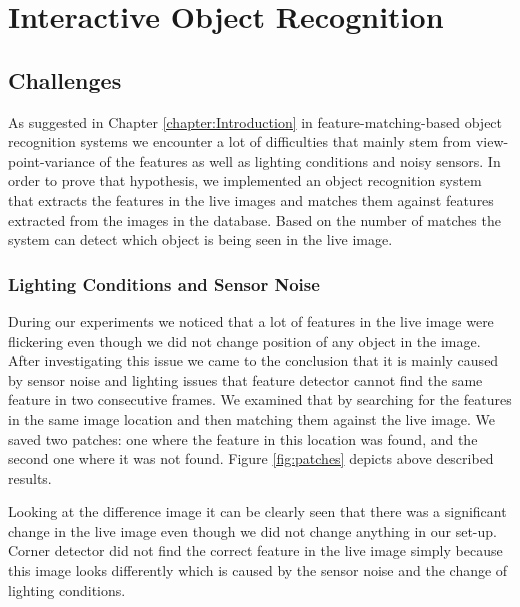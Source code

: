 \chapter{Interactive Object Recognition}
\label{chapter:Object Recognition}

\section{Challenges}
As suggested in Chapter \ref{chapter:Introduction} in feature-matching-based object recognition systems we encounter a lot of difficulties that mainly stem from view-point-variance of the features as well as lighting conditions and noisy sensors. In order to prove that hypothesis, we implemented an object recognition system that extracts the features in the  live images and matches them against features extracted from the images in the database. Based on the number of matches the system can detect which object is being seen in the live image.

\subsection{Lighting Conditions and Sensor Noise}

During our experiments we noticed that a lot of features in the live image were flickering even though we did not change position of any object in the image. After investigating this issue we came to the conclusion that it is mainly caused by sensor noise and lighting issues that feature detector cannot find the same feature in two consecutive frames. We examined that by searching for the features in the same image location and then matching them against the live image. We saved two patches: one where the feature in this location was found, and the second one where it was not found. Figure \ref{fig:patches} depicts above described results.

Looking at the difference image it can be clearly seen that there was a significant change in the live image even though we did not change anything in our set-up. Corner detector did not find the correct feature in the live image simply because this image looks differently which is caused by the sensor noise and the change of lighting conditions.


